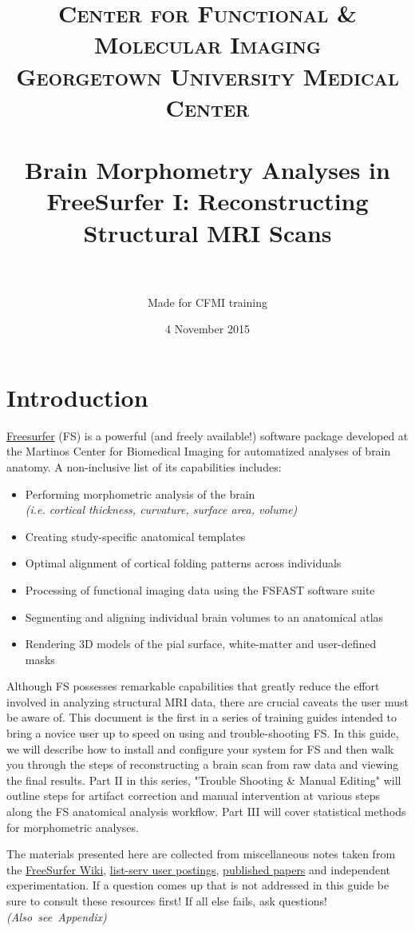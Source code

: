 \documentclass[paper=a4, fontsize=11pt]{scrartcl} %
\title{	
\normalfont \normalsize 
\textsc{Center for Functional \& Molecular Imaging \\ Georgetown University Medical Center} \\ [25pt] %
\horrule{0.5pt} \\[0.4cm] %
\huge Brain Morphometry Analyses in FreeSurfer I:  Reconstructing Structural MRI Scans  \\ %
\horrule{2pt} \\[0.5cm] %
}
\author{Made for CFMI training} %
\date{\normalsize 4 November 2015} %
\numberwithin{equation}{section} %
\numberwithin{figure}{section} %
\numberwithin{table}{section} %
\begin{document}
\maketitle %

\section{Introduction}  \href{https://surfer.nmr.mgh.harvard.edu/}{Freesurfer} (FS) is a powerful (and freely available!) software package developed at the Martinos Center for Biomedical Imaging for automatized analyses of brain anatomy.  A non-inclusive list of its capabilities includes:
\begin{itemize}
	\item Performing morphometric analysis of the brain \\  \textit{(i.e. cortical thickness, curvature, surface area, volume)}
	\item Creating study-specific anatomical templates
	\item Optimal alignment of cortical folding patterns across individuals
	\item Processing of functional imaging data using the FSFAST software suite
	\item Segmenting and aligning individual brain volumes to an anatomical atlas
	\item Rendering 3D models of the pial surface, white-matter and user-defined masks
\end{itemize}

Although FS possesses remarkable capabilities that greatly reduce the effort involved in analyzing structural MRI data, there are crucial caveats the user must be aware of. This document is the first in a series of training guides intended to bring a novice user up to speed on using and trouble-shooting FS.  In this guide, we will describe how to install and configure your system for FS and then walk you through the steps of reconstructing a brain scan from raw data and viewing the final results.  Part II in this series, "Trouble Shooting \& Manual Editing" will outline steps for artifact correction and manual intervention at various steps along the FS anatomical analysis workflow. Part III will cover statistical methods for morphometric analyses.

The materials presented here are collected from miscellaneous notes taken from the \href{https://surfer.nmr.mgh.harvard.edu/fswiki}{FreeSurfer Wiki}, \href{http://www.mail-archive.com/freesurfer@nmr.mgh.harvard.edu/}{list-serv user postings}, \href{https://www.zotero.org/freesurfer}{published papers} and independent experimentation.  If a question comes up that is not addressed in this guide be sure to consult these resources first! If all else fails, ask questions! \mbox{\textit{(Also see Appendix)}}
\end{document}
